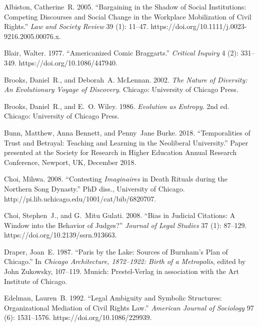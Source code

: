 \documentclass[]{interact}
\theoremstyle{plain}%
\theoremstyle{definition}
\theoremstyle{remark}
\begin{document}
\begin{thebibliography}{}

Albiston, Catherine~R. 2005. ``Bargaining in the Shadow of Social Institutions:
Competing Discourses and Social Change in the Workplace Mobilization of Civil
Rights.'' \emph{Law and Society Review} 39 (1): 11--47.
https://doi.org/{10.1111/j.0023-9216.2005.00076.x}.

Blair, Walter. 1977. ``Americanized Comic Braggarts.'' \emph{Critical Inquiry}
4 (2): 331--349. https://doi.org/{10.1086/447940}.

Brooks, Daniel~R., and Deborah~A. McLennan. 2002. \emph{The Nature of
	Diversity: An Evolutionary Voyage of Discovery}. Chicago: University of
Chicago Press.

Brooks, Daniel~R., and E.~O. Wiley. 1986. \emph{Evolution as Entropy}. 2nd ed.
Chicago: University of Chicago Press.

Bunn, Matthew, Anna Bennett, and Penny~Jane Burke. 2018. ``Temporalities of
Trust and Betrayal: Teaching and Learning in the Neoliberal University.''
Paper presented at the Society for Research in Higher Education Annual
Research Conference, Newport, UK, December 2018.

Choi, Mihwa. 2008. ``Contesting \emph{Imaginaires} in Death Rituals during the
Northern {S}ong Dynasty.'' PhD diss., University of Chicago.
{http://pi.lib.uchicago.edu/1001/cat/bib/6820707}.

Choi, Stephen~J., and G.~Mitu Gulati. 2008. ``Bias in Judicial Citations: A
Window into the Behavior of Judges?'' \emph{Journal of Legal Studies} 37 (1):
87--129. https://doi.org/{10.2139/ssrn.913663}.

Draper, Joan~E. 1987. ``Paris by the Lake: Sources of {B}urnham's Plan of
{C}hicago.'' In \emph{Chicago Architecture, 1872--1922: Birth of a
	Metropolis},  edited by John Zukowsky, 107--119. Munich: Prestel-Verlag in
association with the Art Institute of Chicago.

Edelman, Lauren~B. 1992. ``Legal Ambiguity and Symbolic Structures:
Organizational Mediation of Civil Rights Law.'' \emph{American Journal of
	Sociology} 97 (6): 1531--1576. https://doi.org/{10.1086/229939}.


\end{thebibliography}
\end{document}
